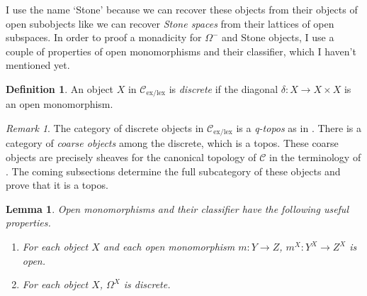 \documentclass[sort&compress]{elsarticle}
\theoremstyle{plain}
\newtheorem{lemma}[theorem]{Lemma}
\theoremstyle{definition}
\newtheorem{defin}[theorem]{Definition}
\theoremstyle{remark}
\newtheorem{remark}[theorem]{Remark}
\newcommand\cat\mathcal
\newcommand\exlex{_\mathrm{ex/lex}}
\begin{document}
I use the name `Stone' because we can recover these objects from their objects of open subobjects like we can recover \emph{Stone spaces} from their lattices of open subspaces.
In order to proof a monadicity for $\Omega^-$ and Stone objects, I use a couple of properties of open monomorphisms and their classifier, which I haven't mentioned yet.

\begin{defin} An object $X$ in $\cat C\exlex$ is \emph{discrete} if the diagonal $\delta:X\to X\times X$ is an open monomorphism. \end{defin}

\begin{remark} The category of discrete objects in $\cat C\exlex$ is a \emph{q-topos} as in \citet{a2CAotTtTC}. There is a category of \emph{coarse objects} among the discrete, which is a topos. These coarse objects are precisely sheaves for the canonical topology of $\cat C$ in the terminology of \citet{MR1870615}. The coming subsections determine the full subcategory of these objects and prove that it is a topos. \end{remark}

\begin{lemma} Open monomorphisms and their classifier have the following useful properties.
\begin{enumerate}
\item For each object $X$ and each open monomorphism $m:Y\to Z$, $m^X:Y^X \to Z^X$ is open.
\item For each object $X$, $\Omega^X$ is discrete.
\end{enumerate}\label{compactdiscrete}
\end{lemma}
\end{document}
